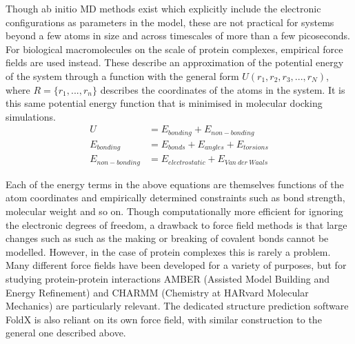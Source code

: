 \documentclass[a4paper,11pt,twoside,openright]{scrbook}
\begin{document}
Though ab initio MD methods exist which explicitly include the electronic configurations as parameters in the model, these are not practical for systems beyond a few atoms in size and across timescales of more than a few picoseconds. For biological macromolecules on the scale of protein complexes, empirical force fields are used instead. These describe an approximation of the potential energy of the system through a function with the general form \begin{math} U(r_{1}, r_{2}, r_{3}, ..., r_{N}) \end{math}, where \begin{math} R = \{r_{1}, ..., r_{n}\} \end{math} describes the coordinates of the atoms in the system. It is this same potential energy function that is minimised in molecular docking simulations.
\begin{align*}
    U &= E_{bonding} + E_{non-bonding}\\
    E_{bonding} &= E_{bonds} + E_{angles} + E_{torsions}\\
    E_{non-bonding} &= E_{electrostatic} + E_{Van\ der\ Waals}
\end{align*}

Each of the energy terms in the above equations are themselves functions of the atom coordinates and empirically determined constraints such as bond strength, molecular weight and so on. Though computationally more efficient for ignoring the electronic degrees of freedom, a drawback to force field methods is that large changes such as such as the making or breaking of covalent bonds cannot be modelled. However, in the case of protein complexes this is rarely a problem. Many different force fields have been developed for a variety of purposes, but for studying protein-protein interactions AMBER \cite{Salomon-Ferrer2013,Amber2017} (Assisted Model Building and Energy Refinement) and CHARMM \cite{Brooks2009} (Chemistry at HARvard Molecular Mechanics) are particularly relevant. The dedicated structure prediction software FoldX \cite{Schymkowitz2005} is also reliant on its own force field, with similar construction to the general one described above.
\end{document}
